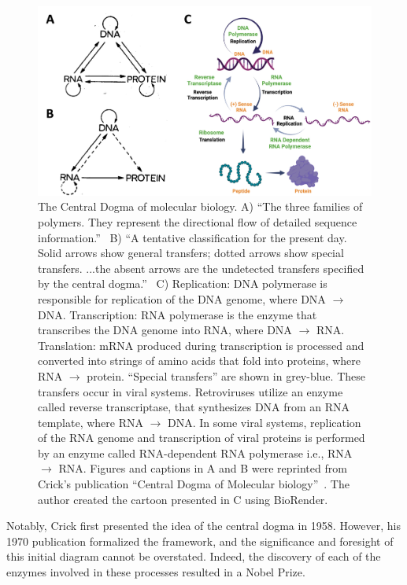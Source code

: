 \begin{figure}
    \centering
    \includegraphics[width=\textwidth]{chapters/figures/central_dogma.jpg}
    \caption{\label{fig:central_dogma}The Central Dogma of molecular biology. 
    A) \enquote{The three families of polymers. They represent the directional flow of detailed sequence information.}~\cite{crick_central}
    B) \enquote{A tentative classification for the present day. Solid arrows show general transfers; dotted arrows show special transfers. ...the absent arrows are the undetected transfers specified by the central dogma.}~\cite{crick_central}
    C) Replication: DNA polymerase is responsible for replication of the DNA genome, where DNA $\rightarrow$ DNA.
    Transcription: RNA polymerase is the enzyme that transcribes the DNA genome into RNA, where DNA $\rightarrow$ RNA. 
    Translation: mRNA produced during transcription is processed and converted into strings of amino acids that fold into proteins, where RNA $\rightarrow$ protein. 
    \enquote{Special transfers} are shown in grey-blue.
    These transfers occur in viral systems.
    Retroviruses utilize an enzyme called reverse transcriptase, that synthesizes DNA from an RNA template, where RNA $\rightarrow$ DNA.
    In some viral systems, replication of the RNA genome and transcription of viral proteins is performed by an enzyme called RNA-dependent RNA polymerase i.e., RNA $\rightarrow$ RNA.
    Figures and captions in A and B were reprinted from Crick's publication \enquote{Central Dogma of Molecular biology}~\cite{crick_central}.
    The author created the cartoon presented in C using BioRender.
    }
\end{figure}

Notably, Crick first presented the idea of the central dogma in 1958. 
However, his 1970 publication formalized the framework, and the significance and foresight of this initial diagram cannot be overstated.
Indeed, the discovery of each of the enzymes involved in these processes resulted in a Nobel Prize.

